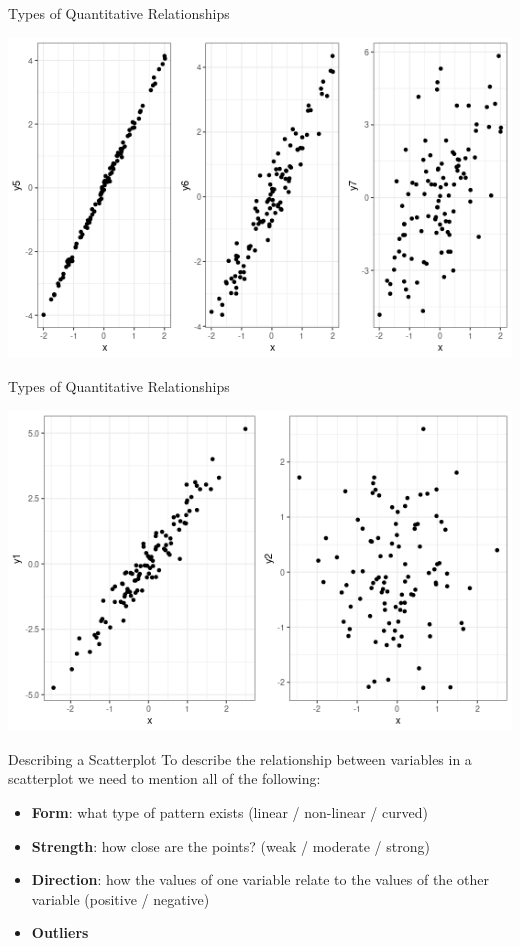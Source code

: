 \documentclass{beamer}
\begin{document}
\begin{frame}{Types of Quantitative Relationships}
\begin{center}
\includegraphics[scale=0.5]{img/linear_strong.png}
\end{center}
\end{frame}


\begin{frame}{Types of Quantitative Relationships}
\begin{center}
\includegraphics[scale=0.5]{img/linear_none.png}
\end{center}
\end{frame}

\begin{frame}{Describing a Scatterplot}
To describe the relationship between variables in a scatterplot we need to mention all of the following: \vspace{3mm}

\begin{itemize}
    \item \textbf{Form}: what type of pattern exists (linear / non-linear / curved)
    \item \textbf{Strength}: how close are the points? (weak / moderate / strong)
    \item \textbf{Direction}: how the values of one variable relate to the values of the other variable (positive / negative)
    \item \textbf{Outliers}
\end{itemize}
\end{frame}
\end{document}
